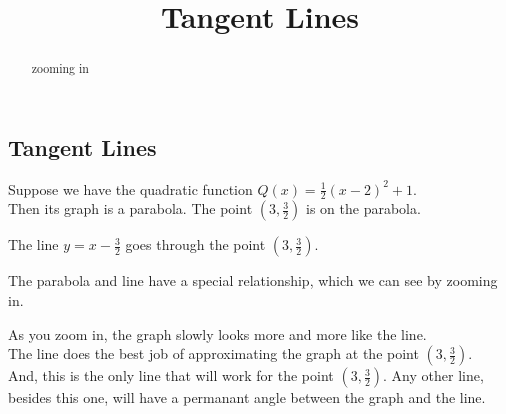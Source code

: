 \documentclass{ximera}
\title{Tangent Lines}
\begin{document}
\begin{abstract}
zooming in
\end{abstract}
\maketitle





\subsection*{Tangent Lines}



Suppose we have the quadratic function $Q(x) = \frac{1}{2} (x - 2)^2 + 1$. \\


Then its graph is a parabola. The point $\left( 3, \frac{3}{2} \right)$ is on the parabola.


The line $y=x-\frac{3}{2}$  goes through the point $\left( 3, \frac{3}{2} \right)$.

The parabola and line have a special relationship, which we can see by zooming in.



\begin{center}
\end{center}



\begin{center}
\end{center}



\begin{center}
\end{center}


\begin{center}
\end{center}



As you zoom in, the graph slowly looks more and more like the line. \\


The line does the best job of approximating the graph at the point $\left( 3, \frac{3}{2} \right)$. \\


And, this is the only line that will work for the point $\left( 3, \frac{3}{2} \right)$.  Any other line, besides this one, will have a permanant angle between the graph and the line.  \\
\end{document}
